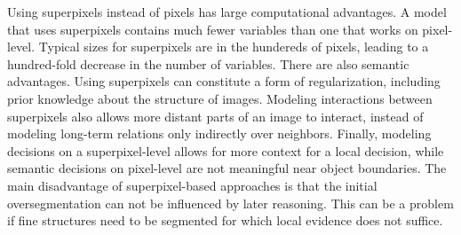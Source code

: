 Using superpixels instead of pixels has large computational advantages.  A
model that uses superpixels contains much fewer variables than one that works
on pixel-level.  Typical sizes for superpixels are in the hundereds of pixels,
leading to a hundred-fold decrease in the number of variables. There are also
semantic advantages. Using superpixels can constitute a form of regularization,
including prior knowledge about the structure of images. Modeling interactions
between superpixels also allows more distant parts of an image to interact,
instead of modeling long-term relations only indirectly over neighbors.
Finally, modeling decisions on a superpixel-level allows for more context for a
local decision, while semantic decisions on pixel-level are not meaningful near
object boundaries.  The main disadvantage of superpixel-based approaches is
that the initial oversegmentation can not be influenced by later reasoning.
This can be a problem if fine structures need to be segmented for which local
evidence does not suffice.
%

